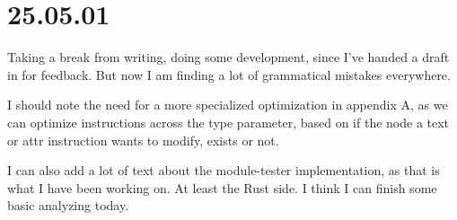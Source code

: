 \section{25.05.01}

Taking a break from writing, doing some development, since I've handed a draft
in for feedback. But now I am finding a lot of grammatical mistakes everywhere.

I should note the need for a more specialized optimization in appendix A, as
we can optimize instructions across the type parameter, based on if the node a
text or attr instruction wants to modify, exists or not.

I can also add a lot of text about the module-tester implementation, as that is
what I have been working on. At least the Rust side. I think I can finish some
basic analyzing today.
